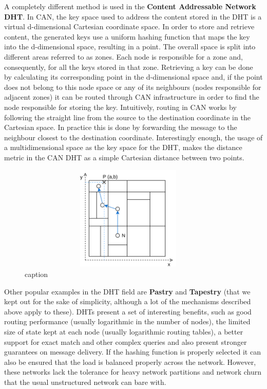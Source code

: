 A completely different method is used in the \textbf{Content Addressable
Network DHT}\cite{Ratnasamy2001a}. In CAN, the key space used to
address the content stored in the DHT is a virtual d-dimensional
Cartesian coordinate space. In order to store and retrieve content, the
generated keys use a uniform hashing function that maps the key into the
d-dimensional space, resulting in a point. The overall space is split
into different areas referred to as zones. Each node is responsible for
a zone and, consequently, for all the keys stored in that zone.
Retrieving a key can be done by calculating its corresponding point in
the d-dimensional space and, if the point does not belong to this node
space or any of its neighbours (nodes responsible for adjacent zones) it
can be routed through CAN infrastructure in order to find the node
responsible for storing the key. Intuitively, routing in CAN works by
following the straight line from the source to the destination
coordinate in the Cartesian space. In practice this is done by
forwarding the message to the neighbour closest to the destination
coordinate. Interestingly enough, the usage of a multidimensional space
as the key space for the DHT, makes the distance metric in the CAN DHT
as a simple Cartesian distance between two points.

\begin{figure}[hb!]
  \centering
  \includegraphics[max height=5cm,max width=0.95\textwidth]{img/can.png}
  \caption{caption}
  \label{fig:can}
\end{figure}

Other popular examples in the DHT field are \textbf{Pastry} \cite{Rowstron2001} and
\textbf{Tapestry} \cite{Zhao2006} (that we kept out for the sake of simplicity, although
a lot of the mechanisms described above apply to these). DHTs present a
set of interesting benefits, such as good routing performance (usually
logarithmic in the number of nodes), the limited size of state kept at
each node (usually logarithmic routing tables), a better support for
exact match and other complex queries and also present stronger
guarantees on message delivery. If the hashing function is properly
selected it can also be ensured that the load is balanced properly
across the network. However, these networks lack the tolerance for heavy
network partitions and network churn that the usual unstructured network
can bare with.
\bigskip

